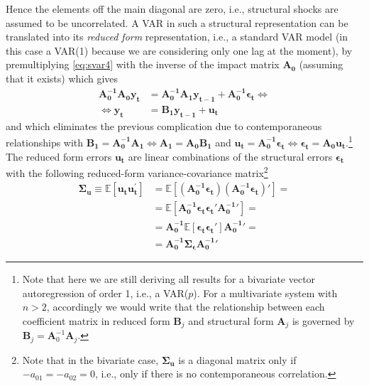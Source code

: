 \documentclass[a4paper,11pt,listof=nochaptergap,oneside,pointednumbers,bibtotoc,bigheadings,liststotoc]{scrbook}
\theoremstyle{mysatz}
\theoremstyle{mydefinition}
\theoremstyle{mybemerkung}
\newcommand{\vect}[1]{\boldsymbol{\mathbf{#1}}}
\begin{document}
\begin{itemize}
Hence the elements off the main diagonal are zero, i.e., structural shocks are assumed to be uncorrelated. A VAR in such a structural representation can be translated into its \textit{reduced form} representation, i.e., a standard VAR model (in this case a VAR(1) because we are considering only one lag at the moment), by premultiplying \ref{eq:svar4} with the inverse of the impact matrix $\vect{A_0}$ (assuming that it exists) which gives
\begin{equation} \label{eq:svar5}
\begin{split}
	          \vect{A_0^{-1}}\vect{A_0}\vect{y_t} & = \vect{A_0^{-1}}\vect{A_1}\vect{y_{t-1}} + \vect{A_0^{-1}}\vect{\epsilon_t}     \iff \\
	\iff 						\vect{y_t} & = \vect{B_1}\vect{y_{t-1}} + \vect{u_t}
\end{split}								
\end{equation}
and which eliminates the previous complication due to contemporaneous relationships with $\vect{B_1} = \vect{A_0^{-1}}\vect{A_1} \iff \vect{A_1} = \vect{A_0}\vect{B_1}$ and $\vect{u_t} = \vect{A_0^{-1}}\vect{\epsilon_t} \iff \vect{\epsilon_t} = \vect{A_0}\vect{u_t}$.\footnote{Note that here we are still deriving all results for a bivariate vector autoregression of order 1, i.e., a VAR($p$). For a multivariate system with $n>2$, accordingly we would write that the relationship between each coefficient matrix in reduced form $\vect{B}_j$ and structural form $\vect{A}_j$ is governed by $\vect{B}_j = \vect{A}_0^{-1}\vect{A}_j$.}\\
The reduced form errors $\vect{u_t}$ are linear combinations of the structural errors $\vect{\epsilon_t}$ with the following reduced-form variance-covariance matrix\footnote{Note that in the bivariate case, $\vect{\Sigma_u}$ is a diagonal matrix only if $-a_{01} = -a_{02} = 0$, i.e., only if there is no contemporaneous correlation.}
\begin{equation} \label{eq:svar6}
\begin{split}
 		\vect{\Sigma_u} \equiv \mathbb{E}[\vect{u_t}\vect{u_t^'}] & = \mathbb{E}[(\vect{A_0^{-1}}\vect{\epsilon_t}) (\vect{A_0^{-1}}\vect{\epsilon_t})' ] = \\
								& = \mathbb{E}[\vect{A_0^{-1}}\vect{\epsilon_t} \vect{\epsilon_t}'\vect{A_0^{-1}}'] = \\
								& = \vect{A_0^{-1}}\mathbb{E}[\vect{\epsilon_t} \vect{\epsilon_t}']\vect{A_0^{-1}}' = \\
								& = \vect{A_0^{-1}}\vect{\Sigma_\epsilon}\vect{A_0^{-1}}'

\end{split}
\end{equation}
\end{itemize}
\end{document}
